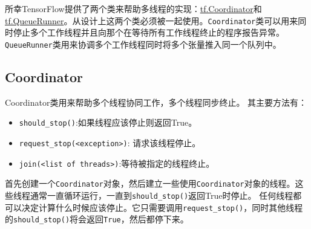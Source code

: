 所幸TensorFlow提供了两个类来帮助多线程的实现：\href{tensorflow-zh/SOURCE/api_docs/python/train.md\#Coordinator}{tf.Coordinator}和
\href{tensorflow-zh/SOURCE/api_docs/python/train.md\#QueueRunner}{tf.QueueRunner}。从设计上这两个类必须被一起使用。\texttt{Coordinator}类可以用来同时停止多个工作线程并且向那个在等待所有工作线程终止的程序报告异常。\texttt{QueueRunner}类用来协调多个工作线程同时将多个张量推入同一个队列中。

\subsection{Coordinator }\label{coordinator}

Coordinator类用来帮助多个线程协同工作，多个线程同步终止。 其主要方法有：

\begin{itemize}
\tightlist
\item
  \texttt{should\_stop()}:如果线程应该停止则返回True。
\item
  \texttt{request\_stop(\textless{}exception\textgreater{})}:
  请求该线程停止。
\item
  \texttt{join(\textless{}list\ of\ threads\textgreater{})}:等待被指定的线程终止。
\end{itemize}

首先创建一个\texttt{Coordinator}对象，然后建立一些使用\texttt{Coordinator}对象的线程。这些线程通常一直循环运行，一直到\texttt{should\_stop()}返回True时停止。
任何线程都可以决定计算什么时候应该停止。它只需要调用\texttt{request\_stop()}，同时其他线程的\texttt{should\_stop()}将会返回\texttt{True}，然后都停下来。

\begin{Shaded}
\begin{Highlighting}[]
 
    
     

\OperatorTok{=} 

\OperatorTok{=} \NormalTok{[threading.Thread(target}\OperatorTok{=}\OperatorTok{=}  \NormalTok{(}\NormalTok{)]}

  
\end{Highlighting}
\end{Shaded}


